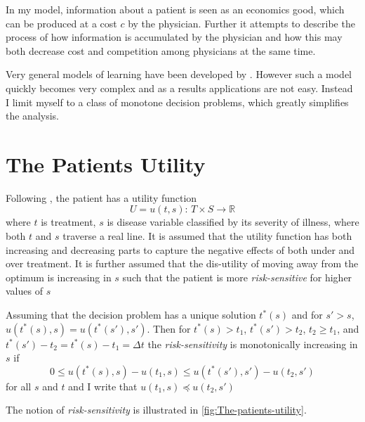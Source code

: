 In my model, information about a patient is seen as an economics good, which can be produced at a cost $c$ by the physician. Further it attempts to describe the process of how information is accumulated by the physician and how this may both decrease cost and competition among physicians at the same time.

Very general models of learning have been developed by \textcite{Grossman1977Bayesian}. However such a model quickly becomes very complex and as a results applications are not easy. Instead I limit myself to a class of monotone decision problems, which greatly simplifies the analysis.

\section{The Patients Utility}

Following \citet{Rochaix1989Information}, the patient has a utility function
\[
	U = u(t,s):\, T\times S\longrightarrow\mathbb{R}
\]
where $t$ is treatment, $s$ is disease variable classified by its severity of illness, where both $t$ and $s$ traverse a real line. It is assumed that the utility function has both increasing and decreasing parts to capture the negative effects of both under and over treatment. It is further assumed that the dis-utility of moving away from the optimum is increasing in $s$  such that the patient is more \emph{risk-sensitive} for higher values of $s$

\begin{definition}\label{def:risk-sensitivity}
Assuming that the decision problem has a unique solution $t^{*}(s)$  and for $s'>s$,  $u(t^{*}(s),s)=u(t^{*}(s'),s')$. Then for $t^{*}(s)>t_{1}$, $t^{*}(s')>t_{2}$,  $t_{2}\ge t_{1}$, and $t^{*}(s')-t_{2}=t^{*}(s)-t_{1}=\Delta t$ the \emph{risk-sensitivity} is monotonically increasing in $s$  if
\[
	0\le u(t^{*}(s),s)-u(t_{1},s)\le u(t^{*}(s'),s')-u(t_{2},s')\label{eq:risk-sensitivity}
\]
for all $s$ and $t$  and I write that $u(t_{1},s)\preceq u(t_{2},s')$
\end{definition}

The notion of \emph{risk-sensitivity} is illustrated in \cref{fig:The-patients-utility}.


